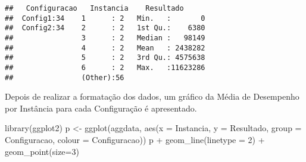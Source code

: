 \documentclass[
]{article}
\newenvironment{Shaded}{\begin{snugshade}}{\end{snugshade}}
\newcommand{\AttributeTok}[1]{\textcolor[rgb]{0.77,0.63,0.00}{#1}}
\newcommand{\ConstantTok}[1]{\textcolor[rgb]{0.00,0.00,0.00}{#1}}
\newcommand{\ControlFlowTok}[1]{\textcolor[rgb]{0.13,0.29,0.53}{\textbf{#1}}}
\newcommand{\DecValTok}[1]{\textcolor[rgb]{0.00,0.00,0.81}{#1}}
\newcommand{\FunctionTok}[1]{\textcolor[rgb]{0.00,0.00,0.00}{#1}}
\newcommand{\NormalTok}[1]{#1}
\newcommand{\OtherTok}[1]{\textcolor[rgb]{0.56,0.35,0.01}{#1}}
\newcommand{\SpecialCharTok}[1]{\textcolor[rgb]{0.00,0.00,0.00}{#1}}
\newcommand{\StringTok}[1]{\textcolor[rgb]{0.31,0.60,0.02}{#1}}
\begin{document}
\begin{Shaded}
\end{Shaded}

\begin{verbatim}
##   Configuracao   Instancia    Resultado       
##  Config1:34    1      : 2   Min.   :       0  
##  Config2:34    2      : 2   1st Qu.:    6380  
##                3      : 2   Median :   98149  
##                4      : 2   Mean   : 2438282  
##                5      : 2   3rd Qu.: 4575638  
##                6      : 2   Max.   :11623286  
##                (Other):56
\end{verbatim}

Depois de realizar a formatação dos dados, um gráfico da Média de
Desempenho por Instância para cada Configuração é apresentado.

\begin{Shaded}
\begin{Highlighting}[]
\FunctionTok{library}\NormalTok{(ggplot2)}
\NormalTok{p }\OtherTok{\textless{}{-}} \FunctionTok{ggplot}\NormalTok{(aggdata, }\FunctionTok{aes}\NormalTok{(}\AttributeTok{x =}\NormalTok{ Instancia, }
                         \AttributeTok{y =}\NormalTok{ Resultado, }
                         \AttributeTok{group =}\NormalTok{ Configuracao, }
                         \AttributeTok{colour =}\NormalTok{ Configuracao))}
\NormalTok{p }\SpecialCharTok{+} \FunctionTok{geom\_line}\NormalTok{(}\AttributeTok{linetype =} \DecValTok{2}\NormalTok{) }\SpecialCharTok{+} \FunctionTok{geom\_point}\NormalTok{(}\AttributeTok{size=}\DecValTok{3}\NormalTok{)}
\end{Highlighting}
\end{Shaded}
\end{document}
